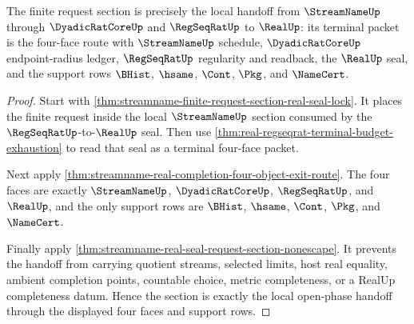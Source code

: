 \begin{theorem}
\label{thm:streamname-open-phase-request-handoff}
The finite request section is precisely the local handoff from
$\StreamNameUp$ through $\DyadicRatCoreUp$ and $\RegSeqRatUp$ to $\RealUp$: its
terminal packet is the four-face route with $\StreamNameUp$ schedule,
$\DyadicRatCoreUp$ endpoint-radius ledger, $\RegSeqRatUp$ regularity and
readback, the $\RealUp$ seal, and the support rows $\BHist$, $\hsame$,
$\Cont$, $\Pkg$, and $\NameCert$.
\end{theorem}
\begin{proof}
Start with
\autoref{thm:streamname-finite-request-section-real-seal-lock}. It places the
finite request inside the local $\StreamNameUp$ section consumed by the
$\RegSeqRatUp$-to-$\RealUp$ seal. Then use
\autoref{thm:real-regseqrat-terminal-budget-exhaustion} to read that seal as a
terminal four-face packet.

Next apply
\autoref{thm:streamname-real-completion-four-object-exit-route}. The four
faces are exactly $\StreamNameUp$, $\DyadicRatCoreUp$, $\RegSeqRatUp$, and
$\RealUp$, and the only support rows are $\BHist$, $\hsame$, $\Cont$, $\Pkg$,
and $\NameCert$.

Finally apply
\autoref{thm:streamname-real-seal-request-section-nonescape}. It prevents the
handoff from carrying quotient streams, selected limits, host real equality,
ambient completion points, countable choice, metric completeness, or a RealUp
completeness datum. Hence the section is exactly the local open-phase handoff
through the displayed four faces and support rows.
\end{proof}

